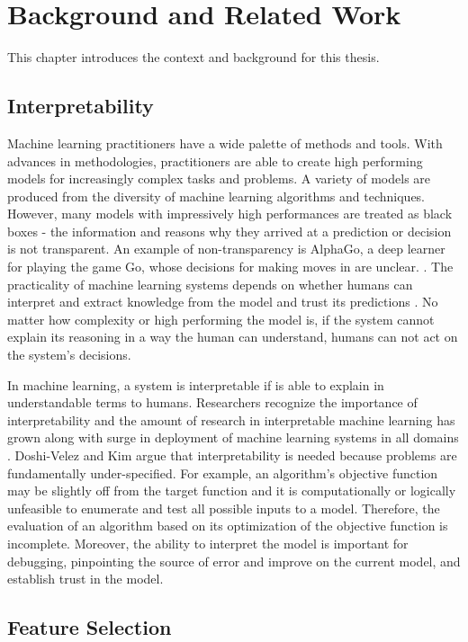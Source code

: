 \chapter{Background and Related Work}
\indent This chapter introduces the context and background for this thesis.
\section{Interpretability}
\indent Machine learning practitioners have a wide palette of methods and tools. With advances in methodologies, practitioners are able to create high performing models for increasingly complex tasks and problems. A variety of models are produced from the diversity of machine learning algorithms and techniques. However, many models with impressively high performances are treated as black boxes - the information and reasons why they arrived at a prediction or decision is not transparent. An example of non-transparency is AlphaGo, a deep learner for playing the game Go, whose decisions for making moves in are unclear. \cite{InterpretDLModels}. The practicality of machine learning systems depends on whether humans can interpret and extract knowledge from the model and trust its predictions \cite{MakeMLInterpretable}. No matter how complexity or high performing the model is, if the system cannot explain its reasoning in a way the human can understand, humans can not act on the system’s decisions.

\indent In machine learning, a system is interpretable if is able to explain in understandable terms to humans. Researchers recognize the importance of interpretability and the amount of research in interpretable machine learning has grown along with surge in deployment of machine learning systems in all domains \citet{RigorousIntretable}. Doshi-Velez and Kim argue that interpretability is needed because problems are fundamentally under-specified. For example, an algorithm’s objective function may be slightly off from the target function and it is computationally or logically unfeasible to enumerate and test all possible inputs to a model. Therefore, the evaluation of an algorithm based on its optimization of the objective function is incomplete. Moreover, the ability to interpret the model is important for debugging, pinpointing the source of error and improve on the current model, and establish trust in the model. 
\section{Feature Selection}
